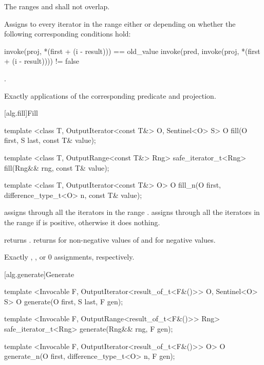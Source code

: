 \begin{itemdescr}
\pnum
\requires
The ranges
and
shall not overlap.

\pnum
\effects
Assigns to every iterator
in the
range
either
or
depending on whether the following corresponding conditions hold:

\begin{codeblock}
invoke(proj, *(first + (i - result))) == old_value
invoke(pred, invoke(proj, *(first + (i - result)))) != false
\end{codeblock}

\pnum
\returns
{}.

\pnum
\complexity
Exactly
applications of the corresponding predicate and projection.
\end{itemdescr}

[alg.fill]{Fill}

%
%
\begin{itemdecl}
template <class T, OutputIterator<const T&> O, Sentinel<O> S>
  O fill(O first, S last, const T& value);

template <class T, OutputRange<const T&> Rng>
  safe_iterator_t<Rng>
    fill(Rng&& rng, const T& value);

template <class T, OutputIterator<const T&> O>
  O fill_n(O first, difference_type_t<O> n, const T& value);
\end{itemdecl}

\begin{itemdescr}
\pnum
\effects
{} assigns  through all the
iterators in the range . 
assigns  through all the iterators in the range 
if  is positive, otherwise it does nothing.

\pnum
\returns {} returns .  returns 
for non-negative values of  and  for negative values.

\pnum
\complexity
Exactly
,
, or 0 assignments, respectively.
\end{itemdescr}

[alg.generate]{Generate}

%
%
\begin{itemdecl}
template <Invocable F, OutputIterator<result_of_t<F&()>> O,
    Sentinel<O> S>
  O generate(O first, S last, F gen);

template <Invocable F, OutputRange<result_of_t<F&()>> Rng>
  safe_iterator_t<Rng>
    generate(Rng&& rng, F gen);

template <Invocable F, OutputIterator<result_of_t<F&()>> O>
  O generate_n(O first, difference_type_t<O> n, F gen);
\end{itemdecl}

